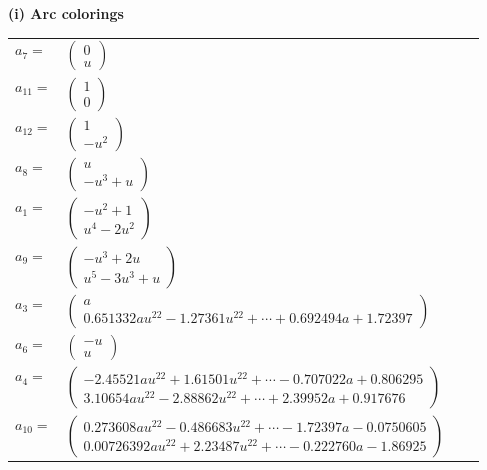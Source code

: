 \documentclass[1p]{elsarticle_modified}
\theoremstyle{definition}
\begin{document}
\flushleft \textbf{(i) Arc colorings}\\
\begin{tabular}{m{7pt} m{180pt} m{7pt} m{180pt} }
\flushright $a_{7}=$&$\begin{pmatrix}0\\u\end{pmatrix}$ \\
\flushright $a_{11}=$&$\begin{pmatrix}1\\0\end{pmatrix}$ \\
\flushright $a_{12}=$&$\begin{pmatrix}1\\- u^2\end{pmatrix}$ \\
\flushright $a_{8}=$&$\begin{pmatrix}u\\- u^3+u\end{pmatrix}$ \\
\flushright $a_{1}=$&$\begin{pmatrix}- u^2+1\\u^4-2 u^2\end{pmatrix}$ \\
\flushright $a_{9}=$&$\begin{pmatrix}- u^3+2 u\\u^5-3 u^3+u\end{pmatrix}$ \\
\flushright $a_{3}=$&$\begin{pmatrix}a\\0.651332 a u^{22}-1.27361 u^{22}+\cdots+0.692494 a+1.72397\end{pmatrix}$ \\
\flushright $a_{6}=$&$\begin{pmatrix}- u\\u\end{pmatrix}$ \\
\flushright $a_{4}=$&$\begin{pmatrix}-2.45521 a u^{22}+1.61501 u^{22}+\cdots-0.707022 a+0.806295\\3.10654 a u^{22}-2.88862 u^{22}+\cdots+2.39952 a+0.917676\end{pmatrix}$ \\
\flushright $a_{10}=$&$\begin{pmatrix}0.273608 a u^{22}-0.486683 u^{22}+\cdots-1.72397 a-0.0750605\\0.00726392 a u^{22}+2.23487 u^{22}+\cdots-0.222760 a-1.86925\end{pmatrix}$ \\

\end{tabular}
\end{document}
